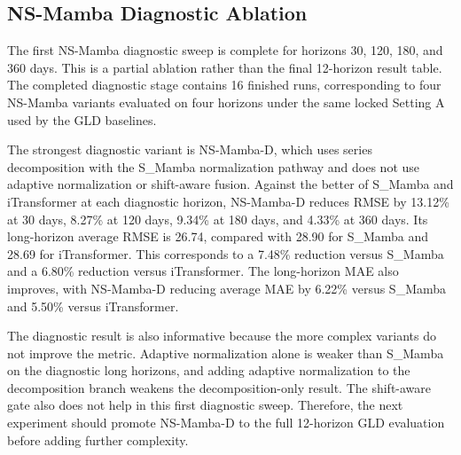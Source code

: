 \subsection{NS-Mamba Diagnostic Ablation}

The first NS-Mamba diagnostic sweep is complete for horizons 30, 120, 180, and 360 days.
This is a partial ablation rather than the final 12-horizon result table.
The completed diagnostic stage contains 16 finished runs, corresponding to four NS-Mamba variants evaluated on four horizons under the same locked Setting A used by the GLD baselines.

\begin{table}[t]
\centering
\caption{Diagnostic GLD RMSE results for NS-Mamba variants. The long average is computed over 120, 180, and 360 days.}
\label{tab:ns-mamba-diagnostic}
\small
{}
\end{table}

The strongest diagnostic variant is NS-Mamba-D, which uses series decomposition with the S\_Mamba normalization pathway and does not use adaptive normalization or shift-aware fusion.
Against the better of S\_Mamba and iTransformer at each diagnostic horizon, NS-Mamba-D reduces RMSE by 13.12\% at 30 days, 8.27\% at 120 days, 9.34\% at 180 days, and 4.33\% at 360 days.
Its long-horizon average RMSE is 26.74, compared with 28.90 for S\_Mamba and 28.69 for iTransformer.
This corresponds to a 7.48\% reduction versus S\_Mamba and a 6.80\% reduction versus iTransformer.
The long-horizon MAE also improves, with NS-Mamba-D reducing average MAE by 6.22\% versus S\_Mamba and 5.50\% versus iTransformer.

The diagnostic result is also informative because the more complex variants do not improve the metric.
Adaptive normalization alone is weaker than S\_Mamba on the diagnostic long horizons, and adding adaptive normalization to the decomposition branch weakens the decomposition-only result.
The shift-aware gate also does not help in this first diagnostic sweep.
Therefore, the next experiment should promote NS-Mamba-D to the full 12-horizon GLD evaluation before adding further complexity.
